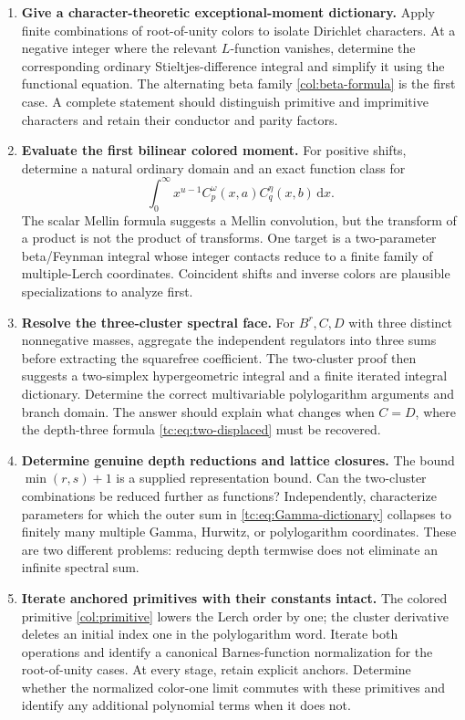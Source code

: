 \documentclass[11pt,a4paper]{article}
\numberwithin{equation}{section}
\theoremstyle{definition}
\theoremstyle{remark}
\newcommand{\dd}{\,\mathrm d}
\begin{document}
\begin{enumerate}[label=\textbf{Q\arabic*.},leftmargin=*]
\item \textbf{Give a character-theoretic exceptional-moment dictionary.}
Apply finite combinations of root-of-unity colors to isolate
Dirichlet characters. At a negative integer where the relevant
$L$-function vanishes, determine the corresponding ordinary
Stieltjes-difference integral and simplify it using the
functional equation. The alternating beta family
\eqref{col:beta-formula} is the first case. A complete statement
should distinguish primitive and imprimitive characters and
retain their conductor and parity factors.

\item \textbf{Evaluate the first bilinear colored moment.}
For positive shifts, determine a natural ordinary domain and an
exact function class for
\[
 \int_0^\infty x^{u-1}
                  C_p^\omega(x,a)C_q^\eta(x,b)\dd x.
\]
The scalar Mellin formula suggests a Mellin convolution, but
the transform of a product is not the product of transforms.
One target is a two-parameter beta/Feynman integral whose
integer contacts reduce to a finite family of multiple-Lerch
coordinates. Coincident shifts and inverse colors are plausible
specializations to analyze first.

\item \textbf{Resolve the three-cluster spectral face.}
For $B^r,C,D$ with three distinct nonnegative masses, aggregate
the independent regulators into three sums before extracting
the squarefree coefficient. The two-cluster proof then suggests
a two-simplex hypergeometric integral and a finite iterated
integral dictionary. Determine the correct multivariable
polylogarithm arguments and branch domain. The answer should
explain what changes when $C=D$, where the depth-three formula
\eqref{tc:eq:two-displaced} must be recovered.

\item \textbf{Determine genuine depth reductions and lattice closures.}
The bound $\min(r,s)+1$ is a supplied representation bound.
Can the two-cluster combinations be reduced further as
functions? Independently, characterize parameters for which
the outer sum in \eqref{tc:eq:Gamma-dictionary} collapses to
finitely many multiple Gamma, Hurwitz, or polylogarithm
coordinates. These are two different problems: reducing
depth termwise does not eliminate an infinite spectral sum.

\item \textbf{Iterate anchored primitives with their constants intact.}
The colored primitive \eqref{col:primitive} lowers the Lerch
order by one; the cluster derivative deletes an initial index
one in the polylogarithm word. Iterate both operations and
identify a canonical Barnes-function normalization for the
root-of-unity cases. At every stage, retain explicit anchors.
Determine whether the normalized color-one limit commutes
with these primitives and identify any additional polynomial
terms when it does not.


\end{enumerate}
\end{document}
